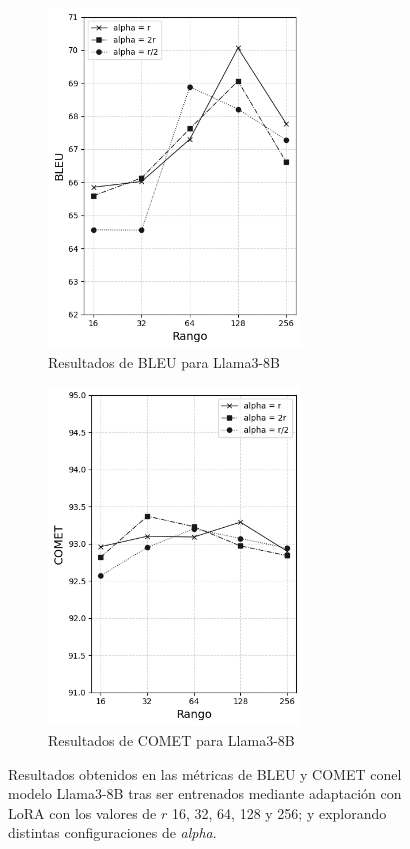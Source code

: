 \documentclass[11pt,spanish,listoffigures,listoftables]{tfgetsinf}
\begin{document}
\begin{figure}[!h]

\begin{subfigure}{0.5\textwidth}
\includegraphics[width=0.9\linewidth, height=9cm]{images/llama_BLEU_} 
\caption{Resultados de BLEU para Llama3-8B}
\label{fig:subim1}
\end{subfigure}
\begin{subfigure}{0.5\textwidth}
\includegraphics[width=0.9\linewidth, height=9cm]{images/llama_COMET_}
\caption{Resultados de COMET para Llama3-8B}
\label{fig:subim2}
\end{subfigure}

\caption{Resultados obtenidos en las métricas de BLEU y COMET conel modelo Llama3-8B tras ser entrenados mediante adaptación con LoRA con los valores de $r$ 16, 32, 64, 128 y 256;  y explorando distintas configuraciones de \textit{alpha}.}
\label{fig:graficasLlama}
\end{figure}
\end{document}
